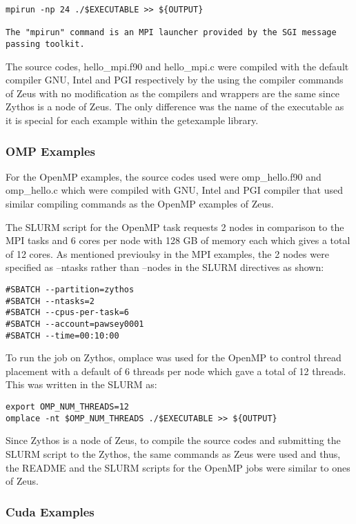 \documentclass[journal]{IEEEtran}
\begin{document}
\begin{verbatim}
mpirun -np 24 ./$EXECUTABLE >> ${OUTPUT}

The "mpirun" command is an MPI launcher provided by the SGI message passing toolkit.
\end{verbatim}

The source codes, hello_mpi.f90 and hello_mpi.c were compiled with the default compiler GNU, Intel and PGI respectively by the using the compiler
commands of Zeus with no modification as the compilers and wrappers are the same since Zythos is a node of Zeus. The only difference was the name of the
executable as it is special for each example within the getexample library.

\subsubsection{OMP Examples}

For the OpenMP examples, the source codes used were omp_hello.f90 and omp_hello.c which were compiled with GNU, Intel and PGI compiler that used similar
compiling commands as the OpenMP examples of Zeus.

The SLURM script for the OpenMP task requests 2 nodes in comparison to the MPI tasks and 6 cores per node with 128 GB of memory each which gives a total 
of 12 cores. As mentioned previoulsy in the MPI examples, the 2 nodes were specified as --ntasks rather than --nodes in the SLURM directives as shown:

\begin{verbatim}
#SBATCH --partition=zythos
#SBATCH --ntasks=2
#SBATCH --cpus-per-task=6
#SBATCH --account=pawsey0001
#SBATCH --time=00:10:00
\end{verbatim}

To run the job on Zythos, omplace was used for the OpenMP to control thread placement with a default of 6 threads per node which gave a total of 12 
threads. This was written in the SLURM as:

\begin{verbatim}
export OMP_NUM_THREADS=12
omplace -nt $OMP_NUM_THREADS ./$EXECUTABLE >> ${OUTPUT}
\end{verbatim}

Since Zythos is a node of Zeus, to compile the source codes and submitting the SLURM script to the Zythos, the same commands as Zeus were used and thus,
the README and the SLURM scripts for the OpenMP jobs were similar to ones of Zeus.

\subsubsection{Cuda Examples}
\end{document}
